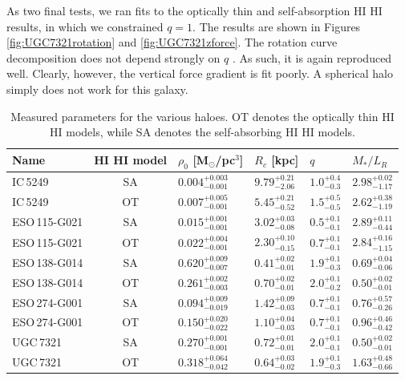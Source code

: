 \documentclass[useAMS,usenatbib]{mn2e}
\newcommand{\hi}{%
  \relax
  \ifmmode
    \textrm{\textsc{HI}}
  \else
    \textsc{H{\smaller}I}
  \fi
}
\begin{document}
As two final tests, we ran fits to the optically thin and self-absorption 
\hi results, in which we constrained $q=1$.
The results are shown in Figures \ref{fig:UGC7321rotation} and 
\ref{fig:UGC7321zforce}.
The rotation curve decomposition does not depend strongly on $q$ 
\citep{OBrien2010D}. As such, it is again reproduced well.
Clearly, however, the vertical force gradient is fit poorly. 
A spherical halo simply does not work for this galaxy.

\begin{table}
\begin{tabular}{lc|llll}
Name & \hi model&$\rho_0$ [M$_\odot$/pc$^3$] & $R_c$ [kpc] & $q$& $M_* / L_R$\\
\hline
IC\,5249&SA&$0.004^{+0.003}_{-0.001}$ & $9.79^{+0.21}_{-2.06}$ & $1.0^{+0.4}_{-0.3}$ &$2.98^{+0.02}_{-1.17}$\\
IC\,5249&OT&$0.007^{+0.005}_{-0.001}$ & $5.45^{+0.21}_{-0.52}$ & $1.5^{+0.5}_{-0.5}$ &$2.62^{+0.38}_{-1.19}$\\
ESO\,115-G021&SA&$0.015^{+0.001}_{-0.001}$ & $3.02^{+0.03}_{-0.08}$ & $0.5^{+0.1}_{-0.1}$ &$2.89^{+0.11}_{-0.44}$\\
ESO\,115-G021&OT&$0.022^{+0.004}_{-0.001}$ & $2.30^{+0.10}_{-0.15}$ & $0.7^{+0.1}_{-0.1}$ &$2.84^{+0.16}_{-1.15}$\\
ESO\,138-G014&SA&$0.620^{+0.009}_{-0.007}$ & $0.41^{+0.02}_{-0.01}$ & $1.9^{+0.1}_{-0.3}$ &$0.69^{+0.04}_{-0.06}$\\
ESO\,138-G014&OT&$0.261^{+0.002}_{-0.003}$ & $0.70^{+0.02}_{-0.01}$ & $2.0^{+0.1}_{-0.2}$ &$0.50^{+0.02}_{-0.01}$\\
ESO\,274-G001&SA&$0.094^{+0.009}_{-0.019}$ & $1.42^{+0.09}_{-0.03}$ & $0.7^{+0.1}_{-0.1}$ &$0.76^{+0.57}_{-0.26}$\\
ESO\,274-G001&OT&$0.150^{+0.020}_{-0.022}$ & $1.10^{+0.04}_{-0.03}$ & $0.7^{+0.1}_{-0.1}$ &$0.96^{+0.46}_{-0.42}$\\
UGC\,7321&SA&$0.270^{+0.001}_{-0.001}$ & $0.72^{+0.01}_{-0.01}$ & $2.0^{+0.1}_{-0.1}$ &$0.50^{+0.02}_{-0.01}$\\
UGC\,7321&OT&$0.318^{+0.064}_{-0.042}$ & $0.64^{+0.03}_{-0.02}$ & $1.9^{+0.1}_{-0.3}$ &$1.63^{+0.48}_{-0.66}$\\
%
\hline
\end{tabular}
\caption[Measured parameters for the various haloes]{Measured parameters for the various haloes. OT denotes the optically thin \hi models, while SA denotes the self-absorbing \hi models.}
\label{tbl:DMhaloes}
\end{table}
\end{document}
